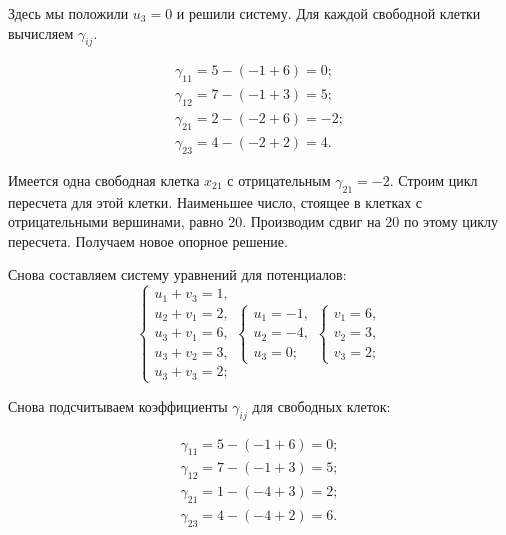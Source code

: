 Здесь мы положили $u_3 = 0$ и решили систему. Для каждой свободной клетки вычисляем $\gamma_{ij}$.

\begin{gather*}
\gamma_{11} = 5 - (-1 + 6) = 0;\\\gamma_{12} = 7 - (-1 + 3) = 5;\\\gamma_{21} = 2 - (-2 + 6) = -2;\\\gamma_{23} = 4 - (-2 + 2) = 4.
\end{gather*}

Имеется одна свободная клетка $x_{21}$ с отрицательным $\gamma_{21} = -2$. Строим цикл пересчета для этой клетки. Наименьшее число, стоящее в клетках с отрицательными вершинами, равно 20. Производим сдвиг на 20 по этому циклу пересчета. Получаем новое опорное решение.

\begin{figure}[h]
\end{figure}

Снова составляем систему уравнений для потенциалов:
$$\begin{cases}
u_1 + v_3 = 1,\\u_2 + v_1 = 2,\\u_3 + v_1 = 6,\\u_3 + v_2 = 3,\\u_3 + v_3 = 2;
\end{cases}
\begin{cases}
u_1 = -1,\\u_2 = -4,\\ u_3 = 0;
\end{cases}
\begin{cases}
v_1 = 6,\\v_2 = 3,\\v_3 = 2;
\end{cases}$$

Снова подсчитываем коэффициенты $\gamma_{ij}$ для свободных клеток:

\begin{gather*}
\gamma_{11} = 5 - (-1 + 6) = 0;\\\gamma_{12} = 7 - (-1 + 3) = 5;\\\gamma_{21} = 1 - (-4 + 3) = 2;\\\gamma_{23} = 4 - (-4 +2) = 6.
\end{gather*}

